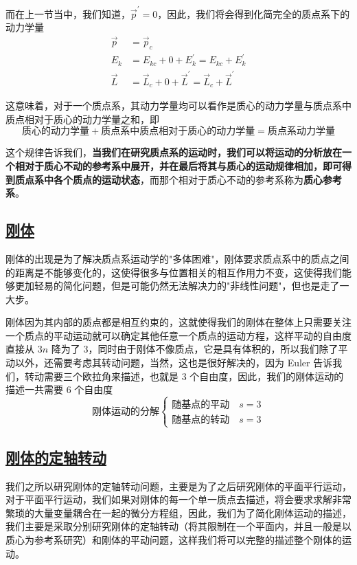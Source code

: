 而在上一节当中，我们知道，$\displaystyle \vec{p}^\prime = 0$，因此，我们将会得到化简完全的质点系下的动力学量
\begin{align}
    \vec{p} &= \vec{p}_c \\
    E_k &= E_{kc} + 0 + E_k^\prime = E_{kc} + E_k^\prime \\
    \vec{L} &= \vec{L}_c + 0 + \vec{L}^\prime = \vec{L}_c + \vec{L}^\prime
\end{align}

这意味着，对于一个质点系，其动力学量均可以看作是质心的动力学量与质点系中质点相对于质心的动力学量之和，即
\begin{equation*}
    \text{质心的动力学量} + \text{质点系中质点相对于质心的动力学量} = \text{质点系动力学量}
\end{equation*}

这个规律告诉我们，\textbf{当我们在研究质点系的运动时，我们可以将运动的分析放在一个相对于质心不动的参考系中展开，并在最后将其与质心的运动规律相加，即可得到质点系中各个质点的运动状态}，而那个相对于质心不动的参考系称为\textbf{质心参考系}。

\subsection{\protect\hyperlink{:}{刚体}}

刚体的出现是为了解决质点系运动学的"多体困难"，刚体要求质点系中的质点之间的距离是不能够变化的，这使得很多与位置相关的相互作用力不变，这使得我们能够更加轻易的简化问题，但是可能仍然无法解决力的"非线性问题"，但也是走了一大步。

刚体因为其内部的质点都是相互约束的，这就使得我们的刚体在整体上只需要关注一个质点的平动运动就可以确定其他任意一个质点的运动方程，这样平动的自由度直接从 $3n$ 降为了 $3$，同时由于刚体不像质点，它是具有体积的，所以我们除了平动以外，还需要考虑其转动问题，当然，这也是很好解决的，因为 Euler 告诉我们，转动需要三个欧拉角来描述，也就是 $3$ 个自由度，因此，我们的刚体运动的描述一共需要 $6$ 个自由度 
\begin{equation}
    \text{刚体运动的分解}
    \begin{cases}
        \text{随基点的平动} \quad s = 3 \\
        \text{随基点的转动} \quad s = 3
    \end{cases}
\end{equation}


\subsection{\protect\hyperlink{:}{刚体的定轴转动}}
我们之所以研究刚体的定轴转动问题，主要是为了之后研究刚体的平面平行运动，对于平面平行运动，我们如果对刚体的每一个单一质点去描述，将会要求求解非常繁琐的大量变量耦合在一起的微分方程组，因此，我们为了简化刚体运动的描述，我们主要是采取分别研究刚体的定轴转动（将其限制在一个平面内，并且一般是以质心为参考系研究）和刚体的平动问题，这样我们将可以完整的描述整个刚体的运动。

